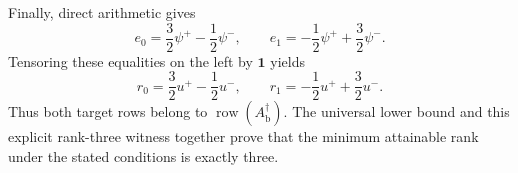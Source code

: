 Finally, direct arithmetic gives
\[
 e_0=\frac32\psi^{+}-\frac12\psi^{-},\qquad
 e_1=-\frac12\psi^{+}+\frac32\psi^{-}.
\]
Tensoring these equalities on the left by \(\mathbf 1\) yields
\[
 r_0=\frac32u^{+}-\frac12u^{-},\qquad
 r_1=-\frac12u^{+}+\frac32u^{-}.
\]
Thus both target rows belong to
\(\operatorname{row}(A_{\mathrm b}^{\dagger})\).  The universal lower bound
and this explicit rank-three witness together prove that the minimum
attainable rank under the stated conditions is exactly three.